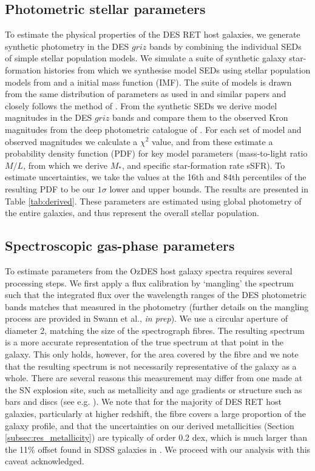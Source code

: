 \documentclass[fleqn,usenatbib,]{mnras}
\newcommand{\replyref}[1]{\color{magenta}#1 \color{black}}
\begin{document}
\subsection{Photometric stellar parameters \label{subsec:sedfit}}
To estimate the physical properties of the DES RET host galaxies, we generate synthetic photometry in the DES $griz$ bands by combining the individual SEDs of simple stellar population models. We simulate a suite of synthetic galaxy star-formation histories from which we synthesise model SEDs using stellar population models from \citet{Bruzual2003}  and a \citet{Chabrier2003} initial mass function (IMF).  The suite of models is drawn from the same distribution of parameters as used in \citet{Kauffmann2003} and similar papers \citep[e.g.][]{Gallazzi2005,Gallazzi2009} and closely follows the method of \citet{Childress2013}. From the synthetic SEDs we derive model magnitudes in the DES $griz$ bands and compare them to the observed Kron magnitudes from the deep photometric catalogue of . For each set of model and observed magnitudes we calculate a $\chi^2$ value, and from these estimate a probability density function (PDF) for key model parameters (mass-to-light ratio $M/L$, from which we derive $M_*$, and specific star-formation rate sSFR). To estimate uncertainties, we take the values at the 16th and 84th percentiles of the resulting PDF to be our $1\sigma$ lower and upper bounds. The results are presented in Table \ref{tab:derived}. These parameters are estimated using global photometry of the entire galaxies, and thus represent the overall stellar population.

\subsection{Spectroscopic gas-phase parameters \label{subsec:linefit}}

To estimate parameters from the OzDES host galaxy spectra requires several processing steps. We first apply a flux calibration by `mangling' the spectrum such that the integrated flux over the wavelength ranges of the DES photometric bands matches that measured in the photometry (further details on the mangling process are provided in Swann et al., \textit{in prep}). We use a circular aperture of diameter 2\arcsec, matching the size of the spectrograph fibres. The resulting spectrum is a more accurate representation of the true spectrum at that point in the galaxy. This only holds, however, for the area covered by the fibre and we note that the resulting spectrum is not necessarily representative of the galaxy as a whole. There are several reasons this measurement may differ from one made at the SN explosion site, such as metallicity and age gradients or structure such as bars and discs (see e.g. \citealt{Iglesias-Paramo2013,Iglesias-Paramo2016}). \replyref{We note that for the majority of DES RET host galaxies, particularly at higher redshift, the fibre covers a large proportion of the galaxy profile, and that the uncertainties on our derived metallicities (Section \ref{subsec:res_metallicity}) are typically of order 0.2 dex, which is much larger than the 11\% offset found in SDSS galaxies in \citet{Iglesias-Paramo2016}}. We proceed with our analysis with this caveat acknowledged. 
\end{document}
